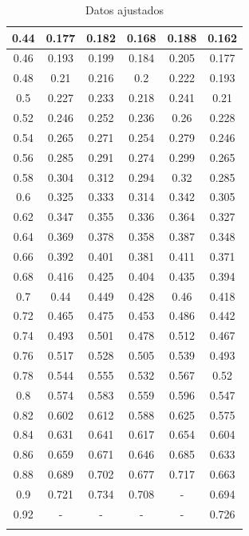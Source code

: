 \documentclass[12pt, titlepage]{report}
\begin{document}
\begin{longtable}{|c|c|c|c|c|c|}
        0.44 & 0.177 & 0.182 & 0.168 & 0.188 & 0.162 \\ \hline
        0.46 & 0.193 & 0.199 & 0.184 & 0.205 & 0.177 \\ \hline
        0.48 & 0.21 & 0.216 & 0.2 & 0.222 & 0.193 \\ \hline
        0.5 & 0.227 & 0.233 & 0.218 & 0.241 & 0.21 \\ \hline
        0.52 & 0.246 & 0.252 & 0.236 & 0.26 & 0.228 \\ \hline
        0.54 & 0.265 & 0.271 & 0.254 & 0.279 & 0.246 \\ \hline
        0.56 & 0.285 & 0.291 & 0.274 & 0.299 & 0.265 \\ \hline
        0.58 & 0.304 & 0.312 & 0.294 & 0.32 & 0.285 \\ \hline
        0.6 & 0.325 & 0.333 & 0.314 & 0.342 & 0.305 \\ \hline
        0.62 & 0.347 & 0.355 & 0.336 & 0.364 & 0.327 \\ \hline
        0.64 & 0.369 & 0.378 & 0.358 & 0.387 & 0.348 \\ \hline
        0.66 & 0.392 & 0.401 & 0.381 & 0.411 & 0.371 \\ \hline
        0.68 & 0.416 & 0.425 & 0.404 & 0.435 & 0.394 \\ \hline
        0.7 & 0.44 & 0.449 & 0.428 & 0.46 & 0.418 \\ \hline
        0.72 & 0.465 & 0.475 & 0.453 & 0.486 & 0.442 \\ \hline
        0.74 & 0.493 & 0.501 & 0.478 & 0.512 & 0.467 \\ \hline
        0.76 & 0.517 & 0.528 & 0.505 & 0.539 & 0.493 \\ \hline
        0.78 & 0.544 & 0.555 & 0.532 & 0.567 & 0.52 \\ \hline
        0.8 & 0.574 & 0.583 & 0.559 & 0.596 & 0.547 \\ \hline
        0.82 & 0.602 & 0.612 & 0.588 & 0.625 & 0.575 \\ \hline
        0.84 & 0.631 & 0.641 & 0.617 & 0.654 & 0.604 \\ \hline
        0.86 & 0.659 & 0.671 & 0.646 & 0.685 & 0.633 \\ \hline
        0.88 & 0.689 & 0.702 & 0.677 & 0.717 & 0.663 \\ \hline
        0.9 & 0.721 & 0.734 & 0.708 & - & 0.694 \\ \hline
        0.92 & - & - & - & - & 0.726 \\ \hline
        \caption{Datos ajustados}
    \end{longtable}
\end{document}
